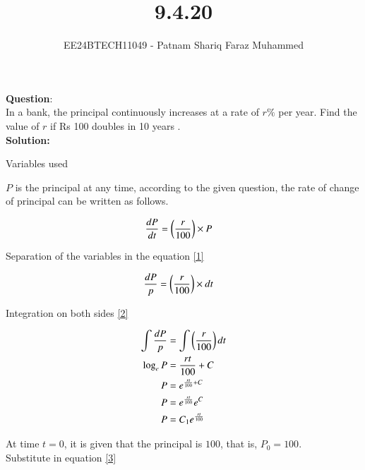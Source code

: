\documentclass[journal]{IEEEtran}
\numberwithin{equation}{enumi}
\numberwithin{figure}{enumi}
\begin{document}


\title{9.4.20}
\author{EE24BTECH11049 - Patnam Shariq Faraz Muhammed}

{\let\newpage\relax\maketitle}

\textbf{Question}:\\

In a bank, the principal continuously increases at a rate of $r\%$ per year. Find the value of $r$ if Rs 100 doubles in 10 years .\\

\textbf{Solution: }\\

\begin{table}[ht!]
    \centering
    
    \caption{Variables used}
    \label{tab:my_label}
\end{table}

$P$ is the principal at any time, according to the given question, the rate of change of principal can be written as follows.

\begin{align}
    \frac{dP}{dt} &= \left(\frac{r}{100}\right) \times P \label{1}
\end{align}

Separation of the variables in the equation \eqref{1}

\begin{align}
     \frac{dP}{p} &= \left(\frac{r}{100}\right) \times dt \label{2}
\end{align}

Integration on both sides \eqref{2}

\begin{align}
    \int{\frac{dP}{p}} &= \int{\ensuremath{\left(\frac{r}{100}\right)} dt}\\
    \log_e{P} &= \frac{rt}{100} + C\\
    P &= e^{\frac{rt}{100} + C}\\
    P &= e^{\frac{rt}{100}}e^C\\
    P &= C_1e^{\frac{rt}{100}} \label{3}
\end{align}

At time $t = 0$, it is given that the principal is $100$, that is, $P_0 = 100$. \\ 
Substitute in equation \eqref{3}
\end{document}
